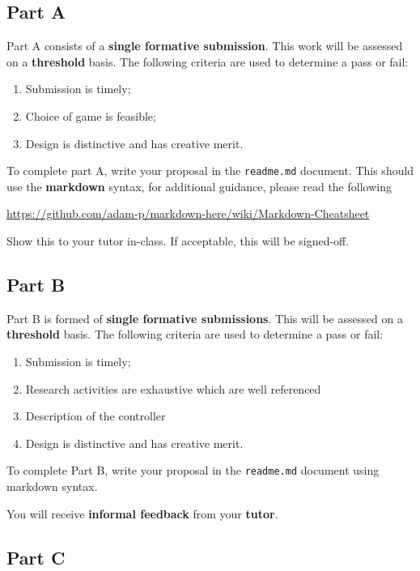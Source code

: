 \documentclass{../../fal_assignment}
\begin{document}
	\subsection*{Part A}
	
	Part A consists of a \textbf{single formative submission}. This work will be assessed on a \textbf{threshold} basis. The following criteria are used to determine a pass or fail:
	
	\begin{enumerate}[label=(\alph*)]
		\item Submission is timely;
		\item Choice of game is feasible;
		\item Design is distinctive and has creative merit.
	\end{enumerate}
	
	To complete part A, write your proposal in the \texttt{readme.md} document. This should use the \textbf{markdown} syntax, for additional guidance, please read the following  
	
	\indent \url{https://github.com/adam-p/markdown-here/wiki/Markdown-Cheatsheet}
	
	Show this to your tutor in-class. If acceptable, this will be signed-off.
	
	\subsection*{Part B}
	
	Part B is formed of \textbf{single formative submissions}. This will be assessed on a \textbf{threshold} basis. The following criteria are used to determine a pass or fail:
	
	\begin{enumerate}[label=(\alph*)]
		\item Submission is timely;
		\item Research activities are exhaustive which are well referenced
		\item Description of the controller 
		\item Design is distinctive and has creative merit.
	\end{enumerate}
	
	To complete Part B, write your proposal in the \texttt{readme.md} document using markdown syntax.
	
	You will receive \textbf{informal feedback} from your \textbf{tutor}.
	
	\subsection*{Part C}
	
\end{document}
